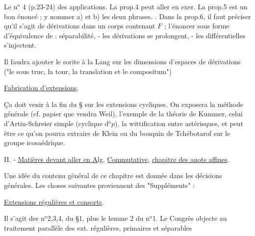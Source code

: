 Le n$^{\mathrm{o}}$ 4 (p.23-24) des applications. La prop.4 peut aller en exer. La prop.5 est un bon énoncé ; y nommer a) et b) les deux phrases. . Dans la prop.6, il faut préciser qu'il s'agit de dérivations dans un corps contenant $F$ ; l'énoncer sous forme d'équivalence de : séparabilité, - les dérivations se prolongent, - les différentielles s'injectent.

Il faudra ajouter le sorite à la Lang sur les dimensions d'espaces de dérivations ("le sous truc, la tour, la translation et le compositum")

\uline{Fabrication d'extensions}.

Ça doit venir à la fin du \S{} sur les extensions cycliques. On exposera la méthode générale (cf. papier que vendra \quad Weil), l'exemple de la théorie de Kummer, celui d'Artin-Schreier simple (cyclique d$^{\mathrm{o}}p$), la wittification entre astérisques, et peut être ce qu'on pourra extraire de Klein ou du bouquin de Tchébotarof sur le groupe icosaédrique.

II. - \uline{Matières devant aller en A}lg. \uline{Commutative}, \uline{chapitre des anots affines}.

Une idée du contenu général de ce chapitre est donnée dans les décisions générales. Les choses suivantes proviennent des "Suppléments" :

\uline{Extensions régulières et consorts}.

Il s'agit des n$^{\mathrm{o}}$2,3,4, du \S{}1, plus le lemme 2 du n$^{\mathrm{o}}$1. Le Congrès objecte au traitement parallèle des ext. régulières, primaires et séparables


